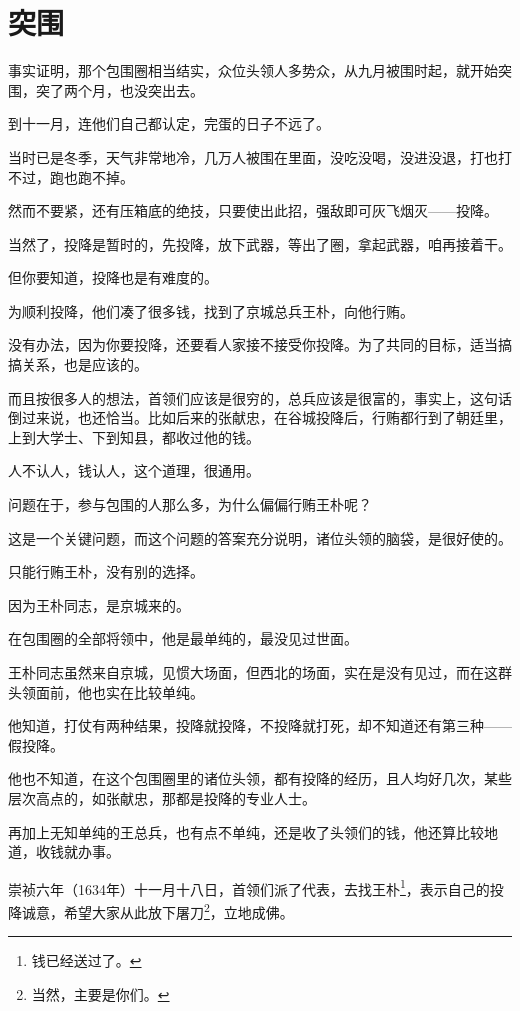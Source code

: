 \section{突围}
\ifnum{}
	\begin{multicols}{\theparacolNo}
\fi
事实证明，那个包围圈相当结实，众位头领人多势众，从九月被围时起，就开始突围，突了两个月，也没突出去。

到十一月，连他们自己都认定，完蛋的日子不远了。

当时已是冬季，天气非常地冷，几万人被围在里面，没吃没喝，没进没退，打也打不过，跑也跑不掉。

然而不要紧，还有压箱底的绝技，只要使出此招，强敌即可灰飞烟灭——投降。

当然了，投降是暂时的，先投降，放下武器，等出了圈，拿起武器，咱再接着干。

但你要知道，投降也是有难度的。

为顺利投降，他们凑了很多钱，找到了京城总兵王朴，向他行贿。

没有办法，因为你要投降，还要看人家接不接受你投降。为了共同的目标，适当搞搞关系，也是应该的。

而且按很多人的想法，首领们应该是很穷的，总兵应该是很富的，事实上，这句话倒过来说，也还恰当。比如后来的张献忠，在谷城投降后，行贿都行到了朝廷里，上到大学士、下到知县，都收过他的钱。

人不认人，钱认人，这个道理，很通用。

问题在于，参与包围的人那么多，为什么偏偏行贿王朴呢？

这是一个关键问题，而这个问题的答案充分说明，诸位头领的脑袋，是很好使的。

只能行贿王朴，没有别的选择。

因为王朴同志，是京城来的。

在包围圈的全部将领中，他是最单纯的，最没见过世面。

王朴同志虽然来自京城，见惯大场面，但西北的场面，实在是没有见过，而在这群头领面前，他也实在比较单纯。

他知道，打仗有两种结果，投降就投降，不投降就打死，却不知道还有第三种——假投降。

他也不知道，在这个包围圈里的诸位头领，都有投降的经历，且人均好几次，某些层次高点的，如张献忠，那都是投降的专业人士。

再加上无知单纯的王总兵，也有点不单纯，还是收了头领们的钱，他还算比较地道，收钱就办事。

崇祯六年（1634年）十一月十八日，首领们派了代表，去找王朴\footnote{钱已经送过了。}，表示自己的投降诚意，希望大家从此放下屠刀\footnote{当然，主要是你们。}，立地成佛。


\end{multicols}
